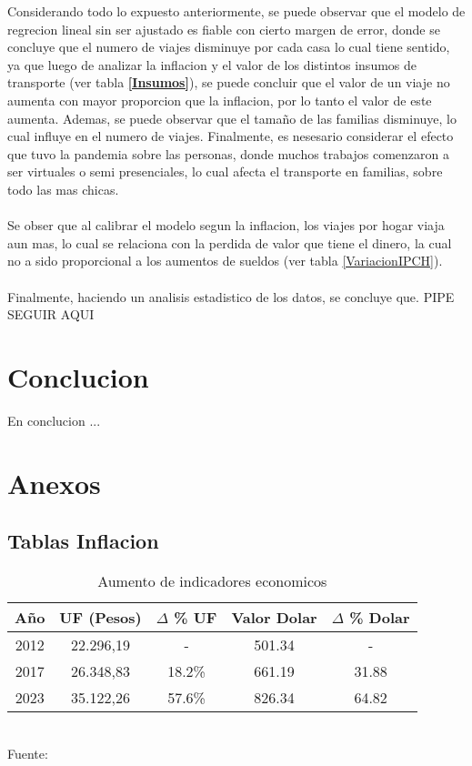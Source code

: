 \documentclass[12pt]{article} %
\begin{document}
Considerando todo lo expuesto anteriormente, se puede observar que el modelo de regrecion lineal sin ser ajustado es fiable con cierto margen de error, donde se concluye que el numero de viajes disminuye por cada casa lo cual tiene sentido, ya que luego de analizar la inflacion y el valor de los distintos insumos de transporte (ver tabla \textbf{\ref{Insumos}}), se puede concluir que el valor de un viaje no aumenta con mayor proporcion que la inflacion, por lo tanto el valor de este aumenta. Ademas, se puede observar que el tamaño de las familias disminuye, lo cual influye en el numero de viajes. Finalmente, es nesesario considerar el efecto que tuvo la pandemia sobre las personas, donde muchos trabajos comenzaron a ser virtuales o semi presenciales, lo cual afecta el transporte en familias, sobre todo las mas chicas.
\\ \\
Se obser que al calibrar el modelo segun la inflacion, los viajes por hogar viaja aun mas, lo cual se relaciona con la perdida de valor que tiene el dinero, la cual no a sido proporcional a los aumentos de sueldos (ver tabla \ref{VariacionIPCH}).
\\ \\
Finalmente, haciendo un analisis estadistico de los datos, se concluye que. PIPE SEGUIR AQUI

\section{Conclucion}

En conclucion ...

\section{Anexos}

\subsection{Tablas Inflacion}

\begin{table}[H]
    \centering
    \caption{Aumento de indicadores economicos}
    \vspace{0.2cm}
    \begin{tabular}{|c|c|c|c|c|}
        \hline
        Año & UF (Pesos) & $\Delta$ \% UF & Valor Dolar & $\Delta$ \% Dolar\\
        \hline
        2012 & 22.296,19 & - & 501.34 & - \\
        2017 & 26.348,83 & 18.2\% & 661.19 & 31.88 \\
        2023 & 35.122,26 & 57.6\% & 826.34 & 64.82 \\
        \hline
    \end{tabular}
    \vspace{0.2cm}
    \\Fuente: \textbf{\cite{sii}}
\end{table}
\end{document}
